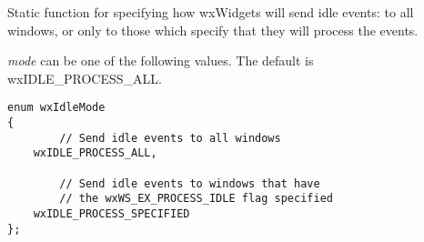 \label{wxidleeventsetmode}


Static function for specifying how wxWidgets will send idle events: to
all windows, or only to those which specify that they
will process the events.

{\it mode} can be one of the following values.
The default is wxIDLE\_PROCESS\_ALL.

\begin{verbatim}
enum wxIdleMode
{
        // Send idle events to all windows
    wxIDLE_PROCESS_ALL,

        // Send idle events to windows that have
        // the wxWS_EX_PROCESS_IDLE flag specified
    wxIDLE_PROCESS_SPECIFIED
};
\end{verbatim}

